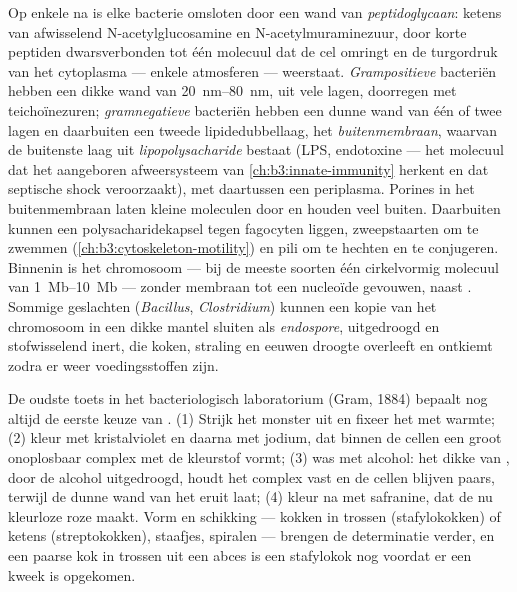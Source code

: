 \begin{definition}\label{def:b3:bacteriology:envelope}
Op enkele na is elke bacterie omsloten door een wand van
\emph{peptidoglycaan}: ketens van afwisselend N-acetylglucosamine en
N-acetylmuraminezuur, door korte peptiden dwarsverbonden tot één
molecuul dat de cel omringt en de turgordruk van het cytoplasma ---
enkele atmosferen --- weerstaat. \emph{Grampositieve} bacteriën hebben
een dikke wand van \qtyrange{20}{80}{nm}, uit vele lagen, doorregen met
teichoïnezuren; \emph{gramnegatieve} bacteriën hebben een dunne wand
van één of twee lagen en daarbuiten een tweede lipidedubbellaag, het
\emph{buitenmembraan}, waarvan de buitenste laag uit
\emph{lipopolysacharide} bestaat (LPS, endotoxine --- het molecuul dat
het aangeboren afweersysteem van \cref{ch:b3:innate-immunity} herkent
en dat septische shock veroorzaakt), met daartussen een periplasma.
Porines in het buitenmembraan laten kleine moleculen door en houden
veel  buiten. Daarbuiten kunnen een polysacharidekapsel
tegen fagocyten liggen, zweepstaarten om te zwemmen
(\cref{ch:b3:cytoskeleton-motility}) en pili om te hechten en te
conjugeren. Binnenin is het chromosoom --- bij de meeste soorten één
cirkelvormig molecuul van \qtyrange{1}{10}{Mb} --- zonder membraan tot
een nucleoïde gevouwen, naast . Sommige geslachten
(\emph{Bacillus}, \emph{Clostridium}) kunnen een kopie van het
chromosoom in een dikke mantel sluiten als \emph{endospore},
uitgedroogd en stofwisselend inert, die koken, straling en eeuwen
droogte overleeft en ontkiemt zodra er weer voedingsstoffen zijn.
\end{definition}

\begin{method}[De gramkleuring]\label{met:b3:bacteriology:gram}
De oudste toets in het bacteriologisch laboratorium (Gram, 1884)
bepaalt nog altijd de eerste keuze van . (1) Strijk het
monster uit en fixeer het met warmte; (2) kleur met kristalviolet en
daarna met jodium, dat binnen de cellen een groot onoplosbaar complex
met de kleurstof vormt; (3) was met alcohol: het dikke 
van , door de alcohol uitgedroogd, houdt het complex
vast en de cellen blijven paars, terwijl de dunne wand van
 het eruit laat; (4) kleur na met safranine, dat de nu
kleurloze  roze maakt. Vorm en schikking --- kokken in
trossen (stafylokokken) of ketens (streptokokken), staafjes, spiralen
--- brengen de determinatie verder, en een paarse kok in trossen uit
een abces is een stafylokok nog voordat er een kweek is opgekomen.
\end{method}

